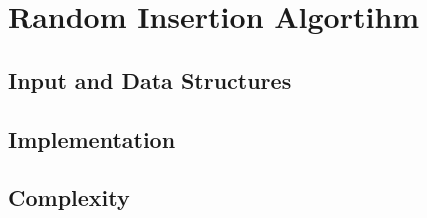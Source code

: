 \section{Random Insertion Algortihm}\label{randominsertion}


\subsection{Input and Data Structures}


\subsection{Implementation}


\subsection{Complexity}


\pagebreak